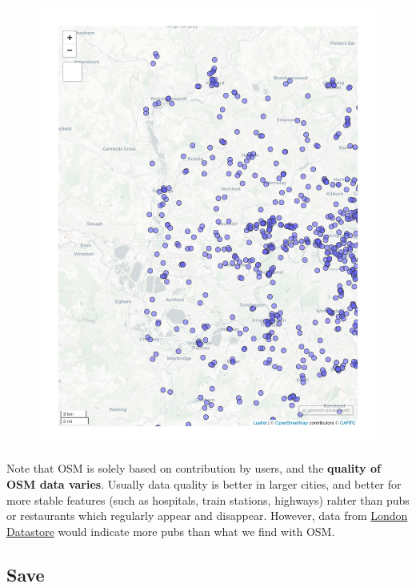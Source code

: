\documentclass[
  letterpaper,
  DIV=11,
  numbers=noendperiod]{scrreprt}
\begin{document}
\begin{figure}[H]

{\centering \includegraphics{01_refresher_files/figure-pdf/unnamed-chunk-19-1.pdf}

}

\end{figure}

Note that OSM is solely based on contribution by users, and the
\textbf{quality of OSM data varies}. Usually data quality is better in
larger cities, and better for more stable features (such as hospitals,
train stations, highways) rahter than pubs or restaurants which
regularly appear and disappear. However, data from
\href{https://data.london.gov.uk/dataset/cultural-infrastructure-map}{London
Datastore} would indicate more pubs than what we find with OSM.

\hypertarget{save}{%
\subsection{Save}\label{save}}
\end{document}
